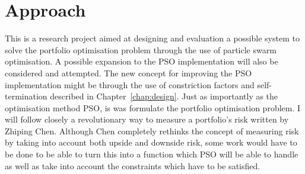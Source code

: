 \documentclass{pdfmx4020}
\begin{document}

  \section{Approach} %
  \label{sec:approach}
  This is a research project aimed at designing and evaluation a possible system to solve the portfolio optimisation problem through the use of particle swarm optimisation. A possible expansion to the PSO implementation \cite{haskellPSO} will also be considered and attempted. The new concept for improving the PSO implementation might be through the use of constriction factors and self-termination described in Chapter~\ref{chap:design}. Just as importantly as the optimisation method PSO, is was formulate the portfolio optimisation problem. I will follow closely a revolutionary way to measure a portfolio's risk \cite{two_sided_risk} written by Zhiping Chen. Although Chen completely rethinks the concept of measuring risk by taking into account both upside and downside risk, some work would have to be done to be able to turn this into a function which PSO will be able to handle as well as take into account the constraints which have to be satisfied. 
\end{document}
